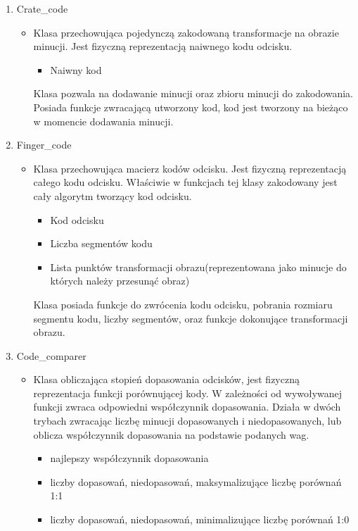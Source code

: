 \begin{enumerate}
	\item Crate\_code
	\renewcommand*{\labelitem}{\bullet}
	\begin{itemize}
		\item Klasa przechowująca pojedynczą zakodowaną transformacje na obrazie minucji. Jest fizyczną reprezentacją naiwnego kodu odcisku. 
		\begin{itemize}
			\item Naiwny kod
		\end{itemize}
		Klasa pozwala na dodawanie minucji oraz zbioru minucji do zakodowania. Posiada funkcje zwracającą utworzony kod, kod jest tworzony na bieżąco w momencie dodawania minucji.
	\end{itemize}
	\item Finger\_code
	\renewcommand*{\labelitem}{\bullet}
	\begin{itemize}
		\item Klasa przechowująca macierz kodów odcisku. Jest fizyczną reprezentacją całego kodu odcisku. Właściwie w funkcjach tej klasy zakodowany jest cały algorytm tworzący kod odcisku.
		\begin{itemize}
			\item Kod odcisku
			\item Liczba segmentów kodu
			\item Lista punktów transformacji obrazu(reprezentowana jako minucje do których należy przesunąć obraz)
		\end{itemize}
		Klasa posiada funkcje do zwrócenia kodu odcisku, pobrania rozmiaru segmentu kodu, liczby segmentów, oraz funkcje dokonujące transformacji obrazu.
	\end{itemize}
	\item Code\_comparer
	\renewcommand*{\labelitem}{\bullet}
	\begin{itemize}
		\item Klasa obliczająca stopień dopasowania odcisków, jest fizyczną reprezentacja funkcji porównującej kody. W zależności od wywoływanej funkcji zwraca odpowiedni współczynnik dopasowania. Działa w 
		dwóch trybach zwracając liczbę minucji dopasowanych i niedopasowanych, lub oblicza współczynnik dopasowania na podstawie podanych wag. 
		\begin{itemize}
			\item najlepszy współczynnik dopasowania
			\item liczby dopasowań, niedopasowań, maksymalizujące liczbę porównań 1:1
			\item liczby dopasowań, niedopasowań, minimalizujące liczbę porównań 1:0

\end{itemize}
\end{itemize}
\end{enumerate}

